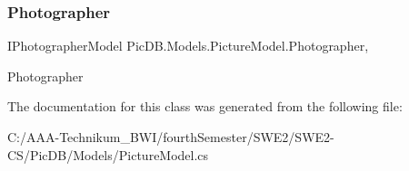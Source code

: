 \subsubsection{\texorpdfstring{Photographer}{Photographer}}
{\footnotesize\ttfamily I\+Photographer\+Model Pic\+D\+B.\+Models.\+Picture\+Model.\+Photographer\hspace{0.3cm}{\ttfamily [get]}, {\ttfamily [set]}}



Photographer 



The documentation for this class was generated from the following file\+:\begin{DoxyCompactItemize}
\item 
C\+:/\+A\+A\+A-\/\+Technikum\+\_\+\+B\+W\+I/fourth\+Semester/\+S\+W\+E2/\+S\+W\+E2-\/\+C\+S/\+Pic\+D\+B/\+Models/Picture\+Model.\+cs\end{DoxyCompactItemize}
